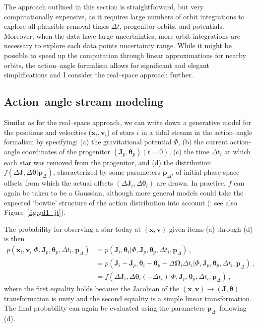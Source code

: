 \documentclass[12pt,preprint]{aastex}
\renewcommand{\figurename}{Figure}
\renewcommand{\vec}[1]{\ensuremath{\mathbf{#1}}}
\newcommand{\vecx}{\ensuremath{\vec{x}}}
\newcommand{\vecv}{\ensuremath{\vec{v}}}
\newcommand{\vecj}{\ensuremath{\vec{J}}}
\newcommand{\veco}{\ensuremath{\vec{\Omega}}}
\newcommand{\veca}{\ensuremath{\boldsymbol\theta}}
\newcommand{\paramsdiff}{\ensuremath{\vec{p}_\Delta}}
\begin{document}
The approach outlined in this section is straightforward, but very
computationally expensive, as it requires large numbers of orbit
integrations to explore all plausible removal times $\Delta t$,
progenitor orbits, and potentials. Moreover, when the data have large
uncertainties, more orbit integrations are necessary to explore each
data points uncertainty range. While it might be possible to speed up
the computation through linear approximations for nearby orbits, the
action--angle formalism allows for significant and elegant
simplifications and I consider the real--space approach further.

\subsection{Action--angle stream modeling}

Similar as for the real--space approach, we can write down a
generative model for the positions and velocities ($\vecx_i,\vecv_i$)
of stars $i$ in a tidal stream in the action--angle formalism by
specifying: (a) the gravitational potential $\Phi$, (b) the current
action-angle coordinates of the progenitor $(\vecj_p,\veca_p)(t=0)$,
(c) the time $\Delta t_i$ at which each star was removed from the
progenitor, and (d) the distribution $f(\Delta \vecj,\Delta
\veca|\paramsdiff)$, characterized by some parameters $\paramsdiff$,
of initial phase-space offsets from which the actual offsets $(\Delta
\vecj_i,\Delta \veca_i)$ are drawn. In practice, $f$ can again be
taken to be a Gaussian, although more general models could take the
expected `bowtie' structure of the action distribution into account
(\citealt{Eyre11a}; see also \figurename~\ref{fig:gd1_jt}).

The probability for observing a star today at $(\vecx,\vecv)$ given
items (a) through (d) is then
\begin{align}\label{eq:aadft}
  p(\vecx_i,\vecv_i | \Phi,\vecj_p,\veca_p,\Delta t_i,\paramsdiff) 
  & = p(\vecj_i,\veca_i | \Phi,\vecj_p,\veca_p,\Delta t_i,\paramsdiff) \,,\nonumber\\
  & = p(\vecj_i-\vecj_p,\veca_i-\veca_p-\Delta \veco_i\Delta t_i | \Phi,\vecj_p,\veca_p,\Delta t_i,\paramsdiff) \,,\\
  & = f(\Delta \vecj_i,\Delta \veca_i(-\Delta t_i) | \Phi,\vecj_p,\veca_p,\Delta t_i,\paramsdiff) \,,\nonumber
\end{align}
where the first equality holds because the Jacobian of the
$(\vecx,\vecv)\rightarrow(\vecj,\veca)$ transformation is unity and
the second equality is a simple linear transformation. The final
probability can again be evaluated using the parameters
\paramsdiff\ following (d).
\end{document}
